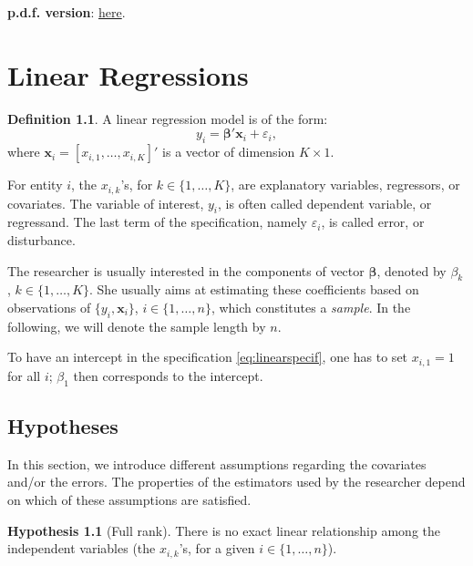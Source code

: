 \documentclass[
  12pt,
]{book}
\theoremstyle{definition}
\newtheorem{definition}{Definition}[chapter]
\theoremstyle{definition}
\theoremstyle{definition}
\theoremstyle{definition}
\newtheorem{hypothesis}{Hypothesis}[chapter]
\theoremstyle{remark}
\begin{document}
\textbf{p.d.f. version}: \href{https://www.dropbox.com/s/td4bqpbzfuvwsev/ApplEcts.pdf?dl=0}{here}.

\hypertarget{ChapterLS}{%
\chapter{Linear Regressions}\label{ChapterLS}}

\begin{definition}
\protect\hypertarget{def:essai}{}\label{def:essai}A linear regression model is of the form:
\begin{equation}
y_i = \boldsymbol\beta'\mathbf{x}_{i} + \varepsilon_i,\label{eq:linearspecif}
\end{equation}
where \(\mathbf{x}_{i}=[x_{i,1},\dots,x_{i,K}]'\) is a vector of dimension \(K \times 1\).
\end{definition}

For entity \(i\), the \(x_{i,k}\)'s, for \(k \in \{1,\dots,K\}\), are explanatory variables, regressors, or covariates. The variable of interest, \(y_i\), is often called dependent variable, or regressand. The last term of the specification, namely \(\varepsilon_i\), is called error, or disturbance.

The researcher is usually interested in the components of vector \(\boldsymbol\beta\), denoted by \(\beta_k\), \(k \in \{1,\dots,K\}\). She usually aims at estimating these coefficients based on observations of \(\{y_i,\mathbf{x}_{i}\}\), \(i \in \{1,\dots,n\}\), which constitutes a \emph{sample}. In the following, we will denote the sample length by \(n\).

To have an intercept in the specification \eqref{eq:linearspecif}, one has to set \(x_{i,1}=1\) for all \(i\); \(\beta_1\) then corresponds to the intercept.

\hypertarget{linearHyp}{%
\section{Hypotheses}\label{linearHyp}}

In this section, we introduce different assumptions regarding the covariates and/or the errors. The properties of the estimators used by the researcher depend on which of these assumptions are satisfied.

\begin{hypothesis}[Full rank]
\protect\hypertarget{hyp:fullrank}{}\label{hyp:fullrank}There is no exact linear relationship among the independent variables (the \(x_{i,k}\)'s, for a given \(i \in \{1,\dots,n\}\)).
\end{hypothesis}
\end{document}
